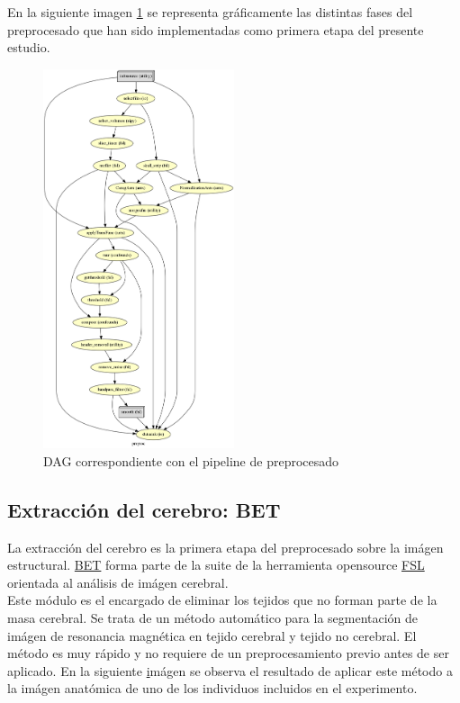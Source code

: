 En la siguiente imagen \ref{preproc:pipeline} se representa gráficamente las distintas fases del preprocesado que han sido implementadas como primera etapa del presente estudio.

\begin{figure}[H]
	\centering
	\includegraphics[width=0.5\textwidth]{img/preproc/graph.png}
	\caption{DAG correspondiente con el pipeline de preprocesado}
	\label{preproc:pipeline}
\end{figure}

\subsection{Extracción del cerebro: BET}

 La extracción del cerebro es la primera etapa del preprocesado sobre la imágen estructural. \hyperref[glos:bet]{BET} forma parte de la suite de la herramienta opensource \hyperref[glos:fsl]{FSL} orientada al análisis de imágen cerebral.\\
  Este módulo es el encargado de eliminar los tejidos que no forman parte de la masa cerebral. 
 Se trata de un método automático para la segmentación de imágen de resonancia magnética en tejido cerebral y tejido no cerebral. El método es muy rápido y no requiere de un preprocesamiento previo antes de ser aplicado.\cite{bet}
 En la siguiente \hyperref[preproc:bet] imágen se observa el resultado de aplicar este método a la imágen anatómica de uno de los individuos incluidos en el experimento.
 
